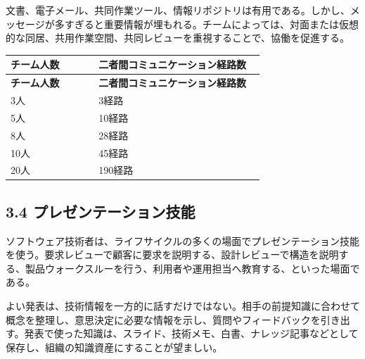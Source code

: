 \documentclass[uplatex,dvipdfmx,a4paper,11pt]{jsarticle}
\begin{document}
文書、電子メール、共同作業ツール、情報リポジトリは有用である。しかし、メッセージが多すぎると重要情報が埋もれる。チームによっては、対面または仮想的な同居、共用作業空間、共同レビューを重視することで、協働を促進する。

\begin{center}
\small
\begin{longtable}{p{0.33\linewidth}p{0.62\linewidth}}
\toprule
\textbf{チーム人数} & \textbf{二者間コミュニケーション経路数} \\
\midrule
\endfirsthead
\toprule
\textbf{チーム人数} & \textbf{二者間コミュニケーション経路数} \\
\midrule
\endhead
3人 & 3経路 \\
\midrule
5人 & 10経路 \\
\midrule
8人 & 28経路 \\
\midrule
10人 & 45経路 \\
\midrule
20人 & 190経路 \\
\midrule
\bottomrule
\end{longtable}
\normalsize
\end{center}

\begin{center}
\end{center}

\subsection*{3.4 プレゼンテーション技能}


ソフトウェア技術者は、ライフサイクルの多くの場面でプレゼンテーション技能を使う。要求レビューで顧客に要求を説明する、設計レビューで構造を説明する、製品ウォークスルーを行う、利用者や運用担当へ教育する、といった場面である。

よい発表は、技術情報を一方的に話すだけではない。相手の前提知識に合わせて概念を整理し、意思決定に必要な情報を示し、質問やフィードバックを引き出す。発表で使った知識は、スライド、技術メモ、白書、ナレッジ記事などとして保存し、組織の知識資産にすることが望ましい。
\end{document}
